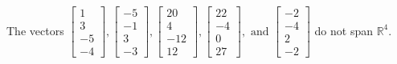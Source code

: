 \begin{exercise}
\begin{exerciseStatement}
  \end{exerciseStatement}
  \begin{exerciseAnswer}
   The vectors \(\left[\begin{array}{r}
1 \\
3 \\
-5 \\
-4
\end{array}\right] , \left[\begin{array}{r}
-5 \\
-1 \\
3 \\
-3
\end{array}\right] , \left[\begin{array}{r}
20 \\
4 \\
-12 \\
12
\end{array}\right] , \left[\begin{array}{r}
22 \\
-4 \\
0 \\
27
\end{array}\right] , \text{ and } \left[\begin{array}{r}
-2 \\
-4 \\
2 \\
-2
\end{array}\right]\) 
  	 do not  
	span \(\mathbb{R}^4\).
  


  \end{exerciseAnswer}
\end{exercise}